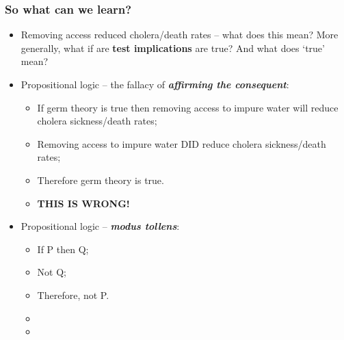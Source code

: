 \documentclass[aspectratio=169]{beamer}
\theoremstyle{principle}
\begin{document}
\begin{frame}
\frametitle{So what can we learn?}
\begin{itemize}
\item Removing access reduced cholera/death rates -- what does this mean?  More generally, what if are \textbf{test implications} are true?  And what does `true' mean?
\bigskip
\item Propositional logic -- the fallacy of \textit{\textbf{affirming the consequent}}:
\begin{itemize}
\item If germ theory is true then removing access to impure water will reduce cholera sickness/death rates;
\item Removing access to impure water DID reduce cholera sickness/death rates;
\item Therefore germ theory is true.
\item \textbf{THIS IS WRONG!}
\end{itemize}
\bigskip
\item Propositional logic -- \textit{\textbf{modus tollens}}:
\begin{itemize}
\item If P then Q;
\item Not Q;
\item Therefore, not P.
\item[]
\item[]
 \end{itemize}
\end{itemize}

\end{frame}
\end{document}
